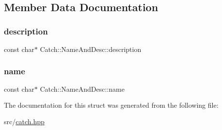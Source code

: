 \subsection{Member Data Documentation}
\mbox{\label{struct_catch_1_1_name_and_desc_a3463a23ff65ce494fc380452b57b7970}} 
\subsubsection{\texorpdfstring{description}{description}}
{\footnotesize\ttfamily const char$\ast$ Catch\+::\+Name\+And\+Desc\+::description}

\mbox{\label{struct_catch_1_1_name_and_desc_a374b4ed8be3cf98be20ebde5273bde51}} 
\subsubsection{\texorpdfstring{name}{name}}
{\footnotesize\ttfamily const char$\ast$ Catch\+::\+Name\+And\+Desc\+::name}



The documentation for this struct was generated from the following file\+:\begin{DoxyCompactItemize}
\item 
src/\hyperlink{catch_8hpp}{catch.\+hpp}\end{DoxyCompactItemize}
